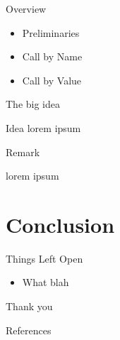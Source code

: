 \documentclass[10pt]{beamer}
\begin{document}
\begin{frame}[fragile]{Overview}
  \begin{itemize}
    \item Preliminaries
    \item Call by Name
    \item Call by Value
  \end{itemize}
\end{frame}




\begin{frame}[fragile]{The big idea}

  \begin{alertblock}{Idea}
    lorem ipsum
  \end{alertblock}

  \pause

  \begin{alertblock}{Remark}

    lorem ipsum
  \end{alertblock}

\end{frame}



\section{Conclusion}


\begin{frame}[fragile]{Things Left Open}
  \begin{itemize}[<+- | alert@+>]
    \item What blah
  \end{itemize}
\end{frame}



\begin{frame}[standout]
  Thank you
\end{frame}

\begin{frame}[allowframebreaks]{References}
  
  
\end{frame}
\end{document}
